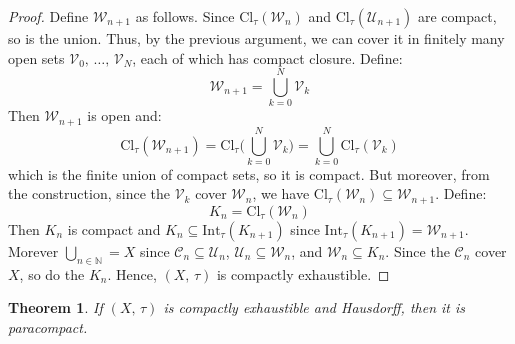 \documentclass{article}
\theoremstyle{plain}
\newtheorem{theorem}{Theorem}[section]
\theoremstyle{normal}
\begin{document}
\begin{proof}
            Define $\mathcal{W}_{n+1}$ as follows. Since
            $\textrm{Cl}_{\tau}(\mathcal{W}_{n})$ and
            $\textrm{Cl}_{\tau}(\mathcal{U}_{n+1})$ are compact, so is the
            union. Thus, by the previous argument, we can cover it in finitely
            many open sets $\mathcal{V}_{0},\,\dots,\,\mathcal{V}_{N}$, each
            of which has compact closure. Define:
            \begin{equation}
                \mathcal{W}_{n+1}=\bigcup_{k=0}^{N}\mathcal{V}_{k}
            \end{equation}
            Then $\mathcal{W}_{n+1}$ is open and:
            \begin{equation}
                \textrm{Cl}_{\tau}(\mathcal{W}_{n+1})
                =\textrm{Cl}_{\tau}\Big(\bigcup_{k=0}^{N}\mathcal{V}_{k}\Big)
                =\bigcup_{k=0}^{N}\textrm{Cl}_{\tau}(\mathcal{V}_{k})
            \end{equation}
            which is the finite union of compact sets, so it is compact.
            But moreover, from the construction, since the $\mathcal{V}_{k}$
            cover $\mathcal{W}_{n}$, we have
            $\textrm{Cl}_{\tau}(\mathcal{W}_{n})\subseteq\mathcal{W}_{n+1}$.
            Define:
            \begin{equation}
                K_{n}=\textrm{Cl}_{\tau}(\mathcal{W}_{n})
            \end{equation}
            Then $K_{n}$ is compact and
            $K_{n}\subseteq\textrm{Int}_{\tau}(K_{n+1})$ since
            $\textrm{Int}_{\tau}(K_{n+1})=\mathcal{W}_{n+1}$. Morever
            $\bigcup_{n\in\mathbb{N}}=X$ since
            $\mathcal{C}_{n}\subseteq\mathcal{U}_{n}$,
            $\mathcal{U}_{n}\subseteq\mathcal{W}_{n}$, and
            $\mathcal{W}_{n}\subseteq{K}_{n}$. Since the $\mathcal{C}_{n}$
            cover $X$, so do the $K_{n}$. Hence, $(X,\,\tau)$ is
            compactly exhaustible.
        \end{proof}
        \begin{theorem}
            If $(X,\,\tau)$ is compactly exhaustible and Hausdorff,
            then it is paracompact.
        \end{theorem}
\end{document}
